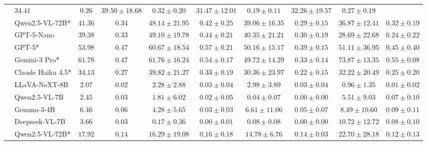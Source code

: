 \documentclass[10pt,letterpaper]{article}
\begin{document}
\begin{table}[ht]
{\begin{tabular}{llcccccccc}
        & $34.41$ & $0.26$
        & $39.50 \pm 18.68$ & $0.32 \pm 0.20$
        & $31.47 \pm 12.01$ & $0.19 \pm 0.11$
        & $32.26 \pm 19.57$ & $0.27 \pm 0.19$ \\
    & Qwen2.5-VL-72B*
        & $41.36$ & $0.34$
        & $48.14 \pm 21.95$ & $0.42 \pm 0.25$
        & $39.06 \pm 16.35$ & $0.29 \pm 0.15$
        & $36.87 \pm 12.41$ & $0.32 \pm 0.19$ \\
    & GPT-5-Nano
        & $39.38$ & $0.33$
        & $49.10 \pm 19.78$ & $0.44 \pm 0.21$
        & $40.35 \pm 21.21$ & $0.30 \pm 0.19$
        & $28.69 \pm 22.68$ & $0.24 \pm 0.22$ \\
    & GPT-5*
        & $53.98$ & $0.47$
        & $60.67 \pm 18.54$ & $0.57 \pm 0.21$
        & $50.16 \pm 15.17$ & $0.39 \pm 0.15$
        & $51.11 \pm 36.95$ & $0.45 \pm 0.40$ \\
    & Gemini-3 Pro*
        & $\mathbf{61.78}$ & $\mathbf{0.47}$
        & $\mathbf{61.76} \pm 16.24$ & $\mathbf{0.54} \pm 0.17$
        & $\mathbf{49.72} \pm 14.29$ & $\mathbf{0.33} \pm 0.14$
        & $\mathbf{73.87} \pm 13.35$ & $\mathbf{0.55} \pm 0.08$ \\
    & Claude Haiku 4.5*
        & $34.13$ & $0.27$
        & $39.82 \pm 21.27$ & $0.33 \pm 0.19$
        & $30.36 \pm 23.97$ & $0.22 \pm 0.15$
        & $32.22 \pm 20.49$ & $0.25 \pm 0.20$ \\
\midrule
{}
    & LLaVA-NeXT-8B
        & $ 2.07$ & $0.02$
        & $ 2.28 \pm  2.88$ & $0.03 \pm 0.04$
        & $ 2.98 \pm  3.89$ & $0.03 \pm 0.04$
        & $ 0.96 \pm  1.35$ & $0.01 \pm 0.02$ \\
    & Qwen2.5-VL-7B
        & $ 2.45$ & $0.03$
        & $ 1.81 \pm  6.02$ & $0.02 \pm 0.05$
        & $ 0.04 \pm  0.07$ & $0.00 \pm 0.00$
        & $ 5.51 \pm  9.03$ & $0.07 \pm 0.10$ \\
    & Gemma-3-4B
        & $ 6.46$ & $0.06$
        & $ 4.28 \pm  5.65$ & $0.03 \pm 0.03$
        & $ 6.61 \pm 11.06$ & $0.05 \pm 0.07$
        & $ 8.49 \pm 10.60$ & $0.09 \pm 0.11$ \\
    & Deepseek-VL-7B
        & $ 3.66$ & $0.03$
        & $ 0.17 \pm  0.36$ & $0.00 \pm 0.01$
        & $ 0.08 \pm  0.08$ & $0.00 \pm 0.00$
        & $10.72 \pm 12.72$ & $0.08 \pm 0.10$ \\
    & Qwen2.5-VL-72B*
        & $17.92$ & $0.14$
        & $16.29 \pm 19.08$ & $0.16 \pm 0.18$
        & $14.78 \pm  6.76$ & $0.14 \pm 0.03$
        & $22.70 \pm 28.18$ & $0.12 \pm 0.13$ \\

\end{tabular}}
\end{table}
\end{document}
